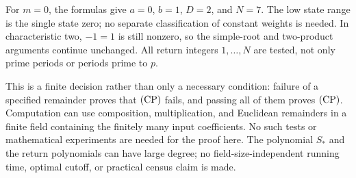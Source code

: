 For $m=0$, the formulas give $a=0$, $b=1$, $D=2$, and $N=7$.
The low state range is the single state zero; no separate
classification of constant weights is needed. In characteristic
two, $-1=1$ is still nonzero, so the simple-root and two-product
arguments continue unchanged. All return integers $1,\ldots,N$
are tested, not only prime periods or periods prime to $p$.

This is a finite decision rather than only a necessary condition:
failure of a specified remainder proves that $\mathrm{(CP)}$ fails, and
passing all of them proves $\mathrm{(CP)}$. Computation can use composition,
multiplication, and Euclidean remainders in a finite field
containing the finitely many input coefficients. No such tests or
mathematical experiments are needed for the proof here. The
polynomial $S_*$ and the return polynomials can have large degree;
no field-size-independent running time, optimal cutoff, or
practical census claim is made.
